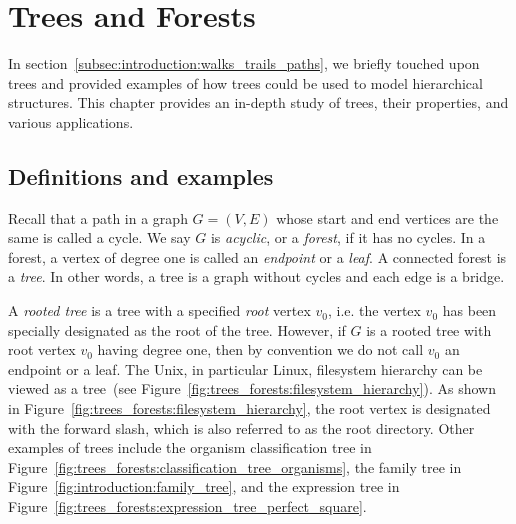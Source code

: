 
\chapter{Trees and Forests}
\label{chap:trees_forests}

In section~\ref{subsec:introduction:walks_trails_paths}, we briefly
touched upon trees and provided examples of how trees could be used to
model hierarchical structures. This chapter provides an in-depth study
of trees, their properties, and various applications.

{
}



\section{Definitions and examples}

Recall that a path in a graph $G = (V, E)$ whose start and end vertices
are the same is called a cycle. We say $G$ is
\emph{acyclic}, or a \emph{forest}, if it
has no cycles. In a forest, a vertex of degree one is called an
\emph{endpoint} or a \emph{leaf}. A
connected forest is a \emph{tree}. In other words, a tree
is a graph without cycles and each edge is a bridge.

A \emph{rooted tree} is a tree with a
specified \emph{root} vertex $v_0$, i.e. the vertex $v_0$
has been specially designated as the root of the tree. However, if $G$
is a rooted tree with root vertex $v_0$ having degree one, then by
convention we do not call $v_0$ an endpoint or a leaf. The
Unix, in particular Linux,
filesystem hierarchy can be viewed as a tree~(see
Figure~\ref{fig:trees_forests:filesystem_hierarchy}). As shown in
Figure~\ref{fig:trees_forests:filesystem_hierarchy}, the root
vertex is designated with the forward slash, which
is also referred to as the root
directory. Other examples of trees include the
organism classification tree in
Figure~\ref{fig:trees_forests:classification_tree_organisms}, the
family tree in
Figure~\ref{fig:introduction:family_tree}, and the
expression tree in
Figure~\ref{fig:trees_forests:expression_tree_perfect_square}.

